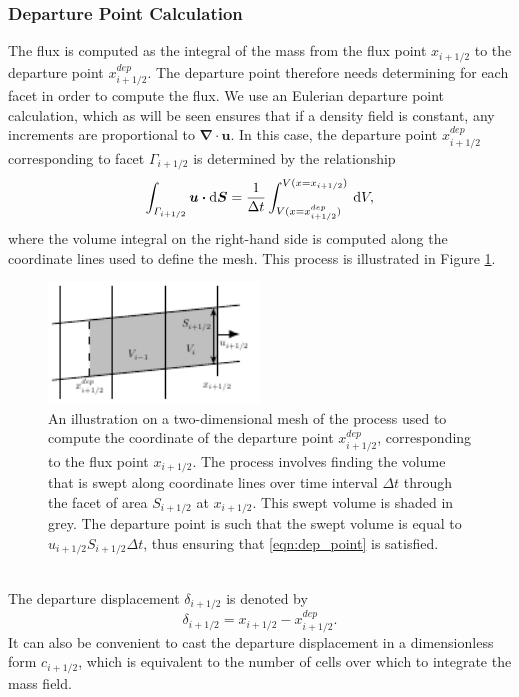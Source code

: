 \documentclass[11pt,a4paper]{article}
\newcommand{\dx}[1]{\hspace{0.75mm}\mathrm{d}{#1}}
\begin{document}
\subsubsection{Departure Point Calculation}
The flux is computed as the integral of the mass from the flux point $x_{i+1/2}$ to the departure point $x^{dep}_{i+1/2}$.
The departure point therefore needs determining for each facet in order to compute the flux.
We use an Eulerian departure point calculation, which as will be seen ensures that if a density field is constant, any increments are proportional to $\bm{\nabla\cdot u}$.
In this case, the departure point $x^{dep}_{i+1/2}$ corresponding to facet $\varGamma_{i+1/2}$ is determined by the relationship
\begin{equation} \label{eqn:dep_point}
\int_{\varGamma_{i+1/2}} \bm{u \cdot} \mathrm{d}\bm{S} = \frac{1}{\Delta t} \int_{V(x=x^{dep}_{i+1/2})}^{V(x=x_{i+1/2})} \dx{V},
\end{equation}
where the volume integral on the right-hand side is computed along the coordinate lines used to define the mesh.
This process is illustrated in Figure \ref{fig:dep_point}. \\
\begin{figure}[h!]
\centering
\includegraphics[width=0.5\textwidth]{fig_1_dep_points.pdf}
\caption{An illustration on a two-dimensional mesh of the process used to compute the coordinate of the departure point $x^{dep}_{i+1/2}$, corresponding to the flux point $x_{i+1/2}$. The process involves finding the volume that is swept along coordinate lines over time interval $\Delta t$ through the facet of area $S_{i+1/2}$ at $x_{i+1/2}$.
This swept volume is shaded in grey.
The departure point is such that the swept volume is equal to $u_{i+1/2}S_{i+1/2}\Delta t$, thus ensuring that \eqref{eqn:dep_point} is satisfied.}
\label{fig:dep_point}
\end{figure} \\
The departure displacement $\delta_{i+1/2}$ is denoted by
\begin{equation}
\delta_{i+1/2} = x_{i+1/2} - x^{dep}_{i+1/2}.
\end{equation}
It can also be convenient to cast the departure displacement in a dimensionless form $c_{i+1/2}$, which is equivalent to the number of cells over which to integrate the mass field. \\
\end{document}
